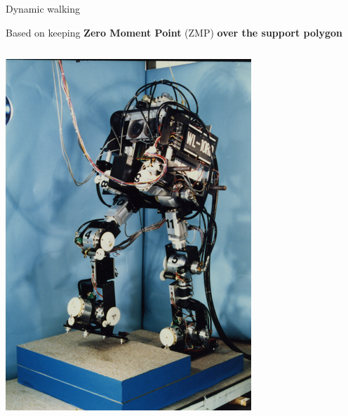 \documentclass[compress]{beamer}
\begin{document}
\begin{frame}{Dynamic walking}

    Based on keeping \textbf{Zero Moment Point} (ZMP) \textbf{over the support polygon}

    \begin{columns}
        \begin{column}{0.5\linewidth}

            \begin{center}
                \includegraphics[height=0.5\paperheight]{image46}


\end{center}
\end{column}
\end{columns}
\end{frame}
\end{document}
